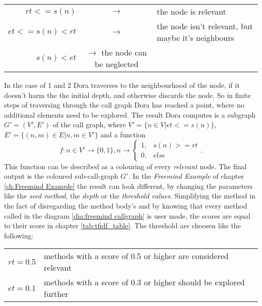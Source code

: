 \vspace{2em} %
\begin{table}[h]
	\centering
	\begin{tabular}{r c l}
		$rt <= s(n)$ & $\rightarrow$ & the node is relevant\\
		$et <= s(n) < rt$ & $\rightarrow$ & the node isn't relevant, but maybe it's neighbours \\
		$s(n) < et$ & $\rightarrow$ the node can be neglected
	\end{tabular}
\end{table}

In the case of 1 and 2 Dora traverses to the neighbourhood of the node, if it doesn't harm the the initial depth, and otherwise discards the node. So in finite steps of traversing through the call graph Dora has reached a point, where no additional elements need to be explored.\newline
The result Dora computes is a subgraph $G'=(V',E')$ of the call graph, where $V' = \{ n \in V | et <= s(n) \}$, $E' = \{ (n,m) \in E | n,m \in V' \}$ and a function \newline
\[
	f: n\in V' \rightarrow \{0,1\},n \rightarrow 
		\left\{
			\begin{array}{ll} 
				1, & s(n) >= rt \\
				0, & else 
			\end{array}\right. .
\]
This function can be described as a colouring of every \textit{relevant} node. The final output is the coloured sub-call-graph $G'$. \newline
\emptyLine
In the \textit{Freemind Example} of chapter \ref{ch:Freemind Example} the result can look different, by changing the parameters like the \textit{seed method}, the \textit{depth} or the \textit{threshold values}.
Simplifying the method in the fact of disregarding the method body's and by knowing that every method called in the diagram \ref{dia:freemind callgraph} is user made, the scores are equal to their score in chapter \ref{tab:tfidf_table}. \newline
The threshold are choosen like the following:
\begin{table}[h]
	\centering
	\begin{tabular}{r l}
		$rt = 0.5$ & methods with a score of 0.5 or higher are considered relevant \\
		$et = 0.1$ & methods with a score of 0.3 or higher should be explored further
	\end{tabular}
\end{table}
